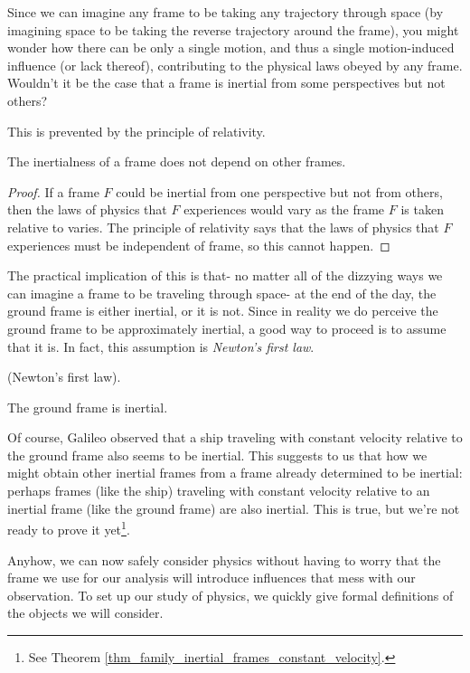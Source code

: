 \documentclass{article}
\begin{document}
Since we can imagine any frame to be taking any trajectory through space (by imagining space to be taking the reverse trajectory around the frame), you might wonder how there can be only a single motion, and thus a single motion-induced influence (or lack thereof), contributing to the physical laws obeyed by any frame. Wouldn't it be the case that a frame is inertial from some perspectives but not others?

This is prevented by the principle of relativity.

\begin{theorem}
    The inertialness of a frame does not depend on other frames.
\end{theorem}

\begin{proof}
    If a frame $F$ could be inertial from one perspective but not from others, then the laws of physics that $F$ experiences would vary as the frame $F$ is taken relative to varies. The principle of relativity says that the laws of physics that $F$ experiences must be independent of frame, so this cannot happen.
\end{proof}

The practical implication of this is that- no matter all of the dizzying ways we can imagine a frame to be traveling through space- at the end of the day, the ground frame is either inertial, or it is not. Since in reality we do perceive the ground frame to be approximately inertial, a good way to proceed is to assume that it is. In fact, this assumption is \textit{Newton's first law}.

\begin{axiom}
    (Newton's first law).
    
    The ground frame is inertial.
\end{axiom}

Of course, Galileo observed that a ship traveling with constant velocity relative to the ground frame also seems to be inertial. This suggests to us that how we might obtain other inertial frames from a frame already determined to be inertial: perhaps frames (like the ship) traveling with constant velocity relative to an inertial frame (like the ground frame) are also inertial. This is true, but we’re not ready to prove it yet\footnote{See Theorem \ref{thm_family_inertial_frames_constant_velocity}.}.

Anyhow, we can now safely consider physics without having to worry that the frame we use for our analysis will introduce influences that mess with our observation. To set up our study of physics, we quickly give formal definitions of the objects we will consider.
\end{document}
